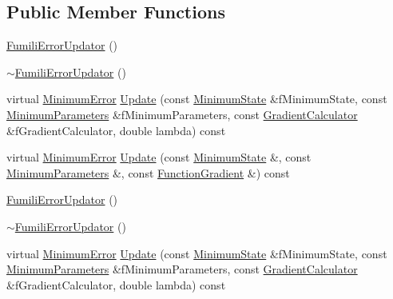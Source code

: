 \subsection*{Public Member Functions}
\begin{DoxyCompactItemize}
\item 
\mbox{\hyperlink{classROOT_1_1Minuit2_1_1FumiliErrorUpdator_a6f6a3c5b10d58710f4d26b431e89907b}{Fumili\+Error\+Updator}} ()
\item 
\mbox{\hyperlink{classROOT_1_1Minuit2_1_1FumiliErrorUpdator_a601351a2ef04f881819b0115f88696e5}{$\sim$\+Fumili\+Error\+Updator}} ()
\item 
virtual \mbox{\hyperlink{classROOT_1_1Minuit2_1_1MinimumError}{Minimum\+Error}} \mbox{\hyperlink{classROOT_1_1Minuit2_1_1FumiliErrorUpdator_a56adeed7f507548e61a3563182f3caaf}{Update}} (const \mbox{\hyperlink{classROOT_1_1Minuit2_1_1MinimumState}{Minimum\+State}} \&f\+Minimum\+State, const \mbox{\hyperlink{classROOT_1_1Minuit2_1_1MinimumParameters}{Minimum\+Parameters}} \&f\+Minimum\+Parameters, const \mbox{\hyperlink{classROOT_1_1Minuit2_1_1GradientCalculator}{Gradient\+Calculator}} \&f\+Gradient\+Calculator, double lambda) const
\item 
virtual \mbox{\hyperlink{classROOT_1_1Minuit2_1_1MinimumError}{Minimum\+Error}} \mbox{\hyperlink{classROOT_1_1Minuit2_1_1FumiliErrorUpdator_ae5ee7f2052c474169dd19ffbc3755bd3}{Update}} (const \mbox{\hyperlink{classROOT_1_1Minuit2_1_1MinimumState}{Minimum\+State}} \&, const \mbox{\hyperlink{classROOT_1_1Minuit2_1_1MinimumParameters}{Minimum\+Parameters}} \&, const \mbox{\hyperlink{classROOT_1_1Minuit2_1_1FunctionGradient}{Function\+Gradient}} \&) const
\item 
\mbox{\hyperlink{classROOT_1_1Minuit2_1_1FumiliErrorUpdator_a6f6a3c5b10d58710f4d26b431e89907b}{Fumili\+Error\+Updator}} ()
\item 
\mbox{\hyperlink{classROOT_1_1Minuit2_1_1FumiliErrorUpdator_a601351a2ef04f881819b0115f88696e5}{$\sim$\+Fumili\+Error\+Updator}} ()
\item 
virtual \mbox{\hyperlink{classROOT_1_1Minuit2_1_1MinimumError}{Minimum\+Error}} \mbox{\hyperlink{classROOT_1_1Minuit2_1_1FumiliErrorUpdator_a8aea4f3c69cee306853aee2b9f302b76}{Update}} (const \mbox{\hyperlink{classROOT_1_1Minuit2_1_1MinimumState}{Minimum\+State}} \&f\+Minimum\+State, const \mbox{\hyperlink{classROOT_1_1Minuit2_1_1MinimumParameters}{Minimum\+Parameters}} \&f\+Minimum\+Parameters, const \mbox{\hyperlink{classROOT_1_1Minuit2_1_1GradientCalculator}{Gradient\+Calculator}} \&f\+Gradient\+Calculator, double lambda) const

\end{DoxyCompactItemize}
